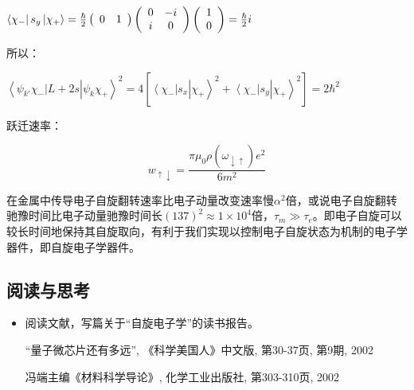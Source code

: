 $\left\langle {\chi _ -  } \right|s_y \left| {\chi _ +  } \right\rangle  = \frac{\hbar }{2}\left( {\begin{array}{*{20}c}
   0 & 1  \\
\end{array}} \right)\left( {\begin{array}{*{20}c}
   0 & { - i}  \\
   i & 0  \\
\end{array}} \right)\left( {\begin{array}{*{20}c}
   1  \\
   0  \\
\end{array}} \right) = \frac{\hbar }{2}i$

所以：

$\left\langle {\psi _{k'} \chi _ -  } \right.\left| {L + 2s} \right.\left| {\psi _k \chi _ +  } \right\rangle ^2  = 4\left[ {\left\langle {\chi _ -  } \right|s_x \left| {\chi _ +  } \right\rangle ^2  + \left\langle {\chi _ -  } \right|s_y \left| {\chi _ +  } \right\rangle ^2 } \right] = 2\hbar ^2 $


跃迁速率：

\begin{equation}\label{25-28}
w_{ \uparrow  \downarrow }  = \frac{{\pi \mu _0 \rho (\omega _{ \downarrow  \uparrow } )e^2 }}{{6m^2 }}
\end{equation}

在金属中传导电子自旋翻转速率比电子动量改变速率慢$\alpha ^2 $倍，或说电子自旋翻转驰豫时间比电子动量驰豫时间长$\left( {137} \right)^2  \approx 1 \times 10^4 $倍，$\tau _m  \gg \tau _e $。即电子自旋可以较长时间地保持其自旋取向，有利于我们实现以控制电子自旋状态为机制的电子学器件，即自旋电子学器件。


\subsection*{阅读与思考}

\begin{itemize}

\item 阅读文献，写篇关于``自旋电子学''的读书报告。

``量子微芯片还有多远'', 《科学美国人》中文版, 第30-37页, 第9期, 2002

冯端主编《材料科学导论》, 化学工业出版社, 第303-310页, 2002

\end{itemize}
